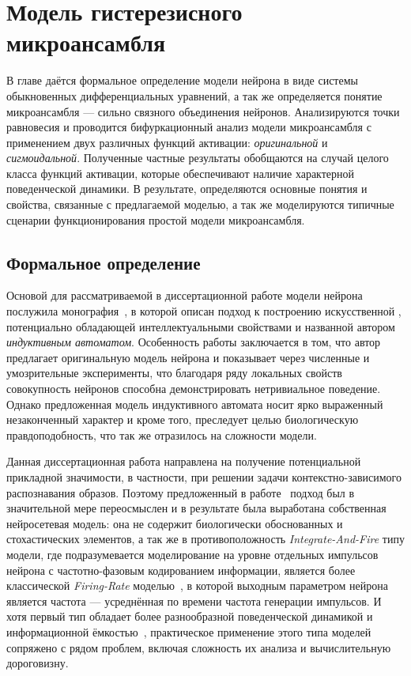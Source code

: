\chapter{Модель гистерезисного микроансамбля} \label{chapter:neuron}

В главе даётся формальное определение модели нейрона в виде системы обыкновенных дифференциальных уравнений, а так же определяется понятие микроансамбля --- сильно связного объединения нейронов. Анализируются точки равновесия и проводится бифуркационный анализ модели микроансамбля с применением двух различных функций активации: \textit{оригинальной} и \textit{сигмоидальной}. Полученные частные результаты обобщаются на случай целого класса функций активации, которые обеспечивают наличие характерной поведенческой динамики. В результате, определяются основные понятия и свойства, связанные с предлагаемой моделью, а так же моделируются типичные сценарии функционирования простой модели микроансамбля.

\section{Формальное определение} \label{section:neuron_model}

Основой для рассматриваемой в диссертационной работе модели нейрона послужила монография~\cite{EmelyanovYaroslavsky1990}, в которой описан подход к построению искусственной , потенциально обладающей интеллектуальными свойствами и названной автором \textit{индуктивным автоматом}. Особенность работы заключается в том, что автор предлагает оригинальную модель нейрона и показывает через численные и умозрительные эксперименты, что благодаря ряду локальных свойств совокупность нейронов способна демонстрировать нетривиальное поведение. Однако предложенная модель индуктивного автомата носит ярко выраженный незаконченный характер и кроме того, преследует целью биологическую правдоподобность, что так же отразилось на сложности модели.

Данная диссертационная работа направлена на получение потенциальной прикладной значимости, в частности, при решении задачи контекстно-зависимого распознавания образов. Поэтому предложенный в работе~\cite{EmelyanovYaroslavsky1990} подход был в значительной мере переосмыслен и в результате была выработана собственная нейросетевая модель: она не содержит биологически обоснованных и стохастических элементов, а так же в противоположность \textit{Integrate-And-Fire} типу модели, где подразумевается моделирование на уровне отдельных импульсов нейрона с частотно-фазовым кодированием информации, является более классической \textit{Firing-Rate}  моделью~\cite{Dayan2001}, в которой выходным параметром нейрона является \socalled частота --- усреднённая по времени частота генерации импульсов. И хотя первый тип обладает более разнообразной поведенческой динамикой и информационной ёмкостью~\cite{Izhikevich2006}, практическое применение этого типа моделей сопряжено с рядом проблем, включая сложность их анализа и вычислительную дороговизну.

